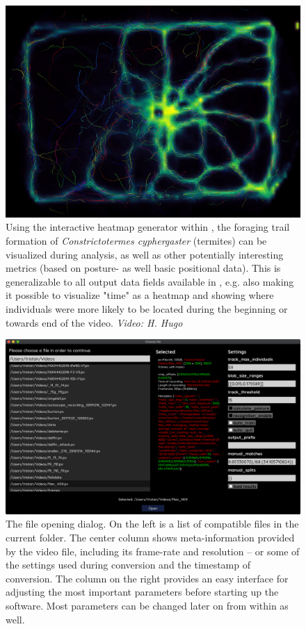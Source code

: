 \documentclass[9pt,lineno]{elife}
\newcommand{\TRex}{\protect\path{TRex}}
\begin{document}
\begin{figure}
\includegraphics[width=1.0\linewidth]{figures/012441.jpg}
\caption{Using the interactive heatmap generator within \TRex{}, the foraging trail formation of \textit{Constrictotermes cyphergaster} (termites) can be visualized during analysis, as well as other potentially interesting metrics (based on posture- as well basic positional data). This is generalizable to all output data fields available in \TRex{}, e.g. also making it possible to visualize "time" as a heatmap and showing where individuals were more likely to be located during the beginning or towards end of the video. \textit{Video: H. Hugo}}
\label{fig:trex_screenshot_heatmaps}
\end{figure}

\begin{figure}
    \centering
   \includegraphics[width=\textwidth]{figures/Screenshot 2020-06-01 at 18.31.36.png}
    \caption{The file opening dialog. On the left is a list of compatible files in the current folder. The center column shows meta-information provided by the video file, including its frame-rate and resolution -- or some of the settings used during conversion and the timestamp of conversion. The column on the right provides an easy interface for adjusting the most important parameters before starting up the software. Most parameters can be changed later on from within \TRex{} as well.}
	\label{fig:file_opening}
\end{figure}
\end{document}
